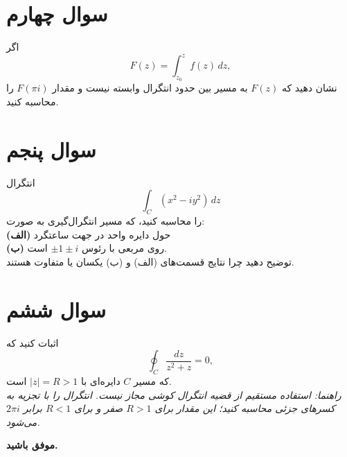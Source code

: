 \documentclass[a4paper,16pt]{article}
\begin{document}
	\section{سوال چهارم}
	اگر 
	\[
	F(z) = \int_{z_0}^{z} f(z)\, dz,
	\]  
	نشان دهید که \(F(z)\) به مسیر بین حدود انتگرال وابسته نیست و مقدار \(F(\pi i)\) را محاسبه کنید.
	
	\section{سوال پنجم}
	انتگرال
	\[
	\int_C (x^2 - i y^2)\, dz
	\]  
	را محاسبه کنید، که مسیر انتگرال‌گیری به صورت:  
	\\
	\textbf{(الف)} حول دایره واحد در جهت ساعتگرد  
	\\
	\textbf{(ب)} روی مربعی با رئوس \(\pm 1 \pm i\) است.  
	\\
	توضیح دهید چرا نتایج قسمت‌های (الف) و (ب) یکسان یا متفاوت هستند.
	
	\section{سوال ششم}
	اثبات کنید که
	\[
	\oint_C \frac{dz}{z^2 + z} = 0,
	\]  
	که مسیر \(C\) دایره‌ای با \(|z| = R > 1\) است. 
	\\ 
	\textit{راهنما: استفاده مستقیم از قضیه انتگرال کوشی مجاز نیست. انتگرال را با تجزیه به کسرهای جزئی محاسبه کنید؛ این مقدار برای \(R>1\) صفر و برای \(R<1\) برابر \(2\pi i\) می‌شود.}
	

	\textbf{موفق باشید.}
\end{document}
